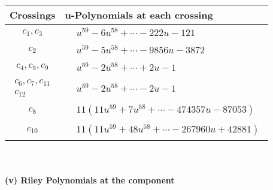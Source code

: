 \documentclass[1p]{elsarticle_modified}
\theoremstyle{definition}
\begin{document}
\begin{tabular}{m{50pt}|m{274pt}}
Crossings & \hspace{64pt}u-Polynomials at each crossing \\
\hline $$\begin{aligned}c_{1},c_{3}\end{aligned}$$&$\begin{aligned}
&u^{59}-6 u^{58}+\cdots-222 u-121
\end{aligned}$\\
\hline $$\begin{aligned}c_{2}\end{aligned}$$&$\begin{aligned}
&u^{59}-5 u^{58}+\cdots-9856 u-3872
\end{aligned}$\\
\hline $$\begin{aligned}c_{4},c_{5},c_{9}\end{aligned}$$&$\begin{aligned}
&u^{59}-2 u^{58}+\cdots+2 u-1
\end{aligned}$\\
\hline $$\begin{aligned}c_{6},c_{7},c_{11}\\c_{12}\end{aligned}$$&$\begin{aligned}
&u^{59}-2 u^{58}+\cdots-2 u-1
\end{aligned}$\\
\hline $$\begin{aligned}c_{8}\end{aligned}$$&$\begin{aligned}
&11(11 u^{59}+7 u^{58}+\cdots-474357 u-87053)
\end{aligned}$\\
\hline $$\begin{aligned}c_{10}\end{aligned}$$&$\begin{aligned}
&11(11 u^{59}+48 u^{58}+\cdots-267960 u+42881)
\end{aligned}$\\
\hline
\end{tabular}\\~\\
\newpage\renewcommand{\arraystretch}{1}
\flushleft \textbf{(v) Riley Polynomials at the component}\newline \\
\end{document}
